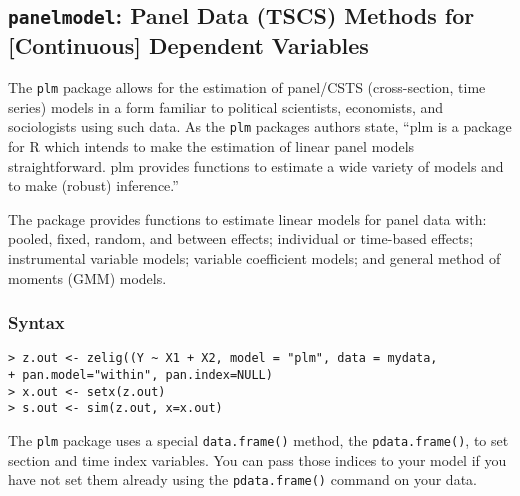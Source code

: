 \subsection{{\tt panelmodel}: Panel Data (TSCS) Methods for [Continuous] Dependent Variables}
\label{zelig2plm}
The \texttt{plm} package allows for the estimation of panel/CSTS (cross-section, time series) models in a form familiar to political scientists, economists, and sociologists using such data. As the \texttt{plm} packages authors state, ``plm is a package for R which intends to make the estimation of linear panel models straightforward. plm provides functions to estimate a wide variety of models and to make (robust) inference.''

The package provides functions to estimate linear models for panel data with: pooled, fixed, random, and between effects; individual or time-based effects; instrumental variable models; variable coefficient models; and general method of moments (GMM) models.

\subsubsection{Syntax}
\begin{verbatim}
> z.out <- zelig((Y ~ X1 + X2, model = "plm", data = mydata, 
+ pan.model="within", pan.index=NULL) 
> x.out <- setx(z.out) 
> s.out <- sim(z.out, x=x.out)
\end{verbatim}

The \texttt{plm} package uses a special \texttt{data.frame()} method, the \texttt{pdata.frame()}, to set section and time index variables. You can pass those indices to your model if you have not set them already using the \texttt{pdata.frame()} command on your data.

